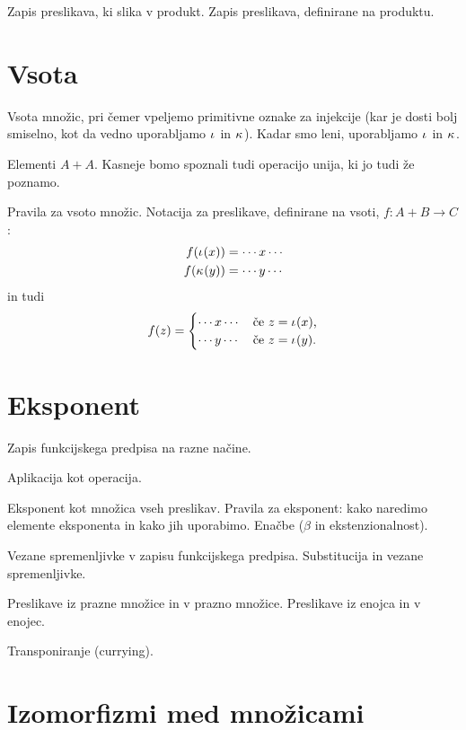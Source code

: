 Zapis preslikava, ki slika v produkt.
Zapis preslikava, definirane na produktu.




\section{Vsota}
\label{sec:vsota}

Vsota množic, pri čemer vpeljemo primitivne oznake za injekcije (kar je dosti bolj
smiselno, kot da vedno uporabljamo $\inl$ in $\inr$). Kadar smo leni, uporabljamo $\inl$
in $\inr$.

Elementi $A + A$. Kasneje bomo spoznali tudi operacijo unija, ki jo tudi že poznamo.

Pravila za vsoto množic. Notacija za preslikave, definirane na vsoti, $f : A + B \to C$:
%
\begin{align*}
  f(\inl(x)) &= \cdots x \cdots \\
  f(\inr(y)) &= \cdots y \cdots
\end{align*}
%
in tudi
%
\begin{align*}
  f(z) =
  \begin{cases}
    \cdots x \cdots & \text{če $z = \inl(x)$,} \\
    \cdots y \cdots & \text{če $z = \inl(y)$.}
  \end{cases}
\end{align*}

\section{Eksponent}
\label{sec:eksponent}



Zapis funkcijskega predpisa na razne načine.

Aplikacija kot operacija.

Eksponent kot množica vseh preslikav. Pravila za eksponent: kako naredimo elemente
eksponenta in kako jih uporabimo. Enačbe ($\beta$ in ekstenzionalnost).

Vezane spremenljivke v zapisu funkcijskega predpisa. Substitucija in vezane spremenljivke.

Preslikave iz prazne množice in v prazno množice. Preslikave iz enojca in v enojec.


Transponiranje (currying).


\section{Izomorfizmi med množicami}
\label{sec:izom-med-mnoic}

